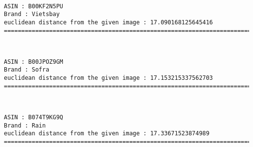 \documentclass[11pt]{article}
\begin{document}
    \begin{center}
    \end{center}
    { \hspace*{\fill} \\}
    
    \begin{Verbatim}[commandchars=\\\{\}]
ASIN : B00KF2N5PU
Brand : Vietsbay
euclidean distance from the given image : 17.090168125645416
=============================================================================================================================

    \end{Verbatim}

    \begin{center}
    \end{center}
    { \hspace*{\fill} \\}
    
    \begin{Verbatim}[commandchars=\\\{\}]
ASIN : B00JPOZ9GM
Brand : Sofra
euclidean distance from the given image : 17.153215337562703
=============================================================================================================================

    \end{Verbatim}

    \begin{center}
    \end{center}
    { \hspace*{\fill} \\}
    
    \begin{Verbatim}[commandchars=\\\{\}]
ASIN : B074T9KG9Q
Brand : Rain
euclidean distance from the given image : 17.33671523874989
=============================================================================================================================

    \end{Verbatim}

    \begin{center}
    \end{center}
    { \hspace*{\fill} \\}
    
\end{document}
